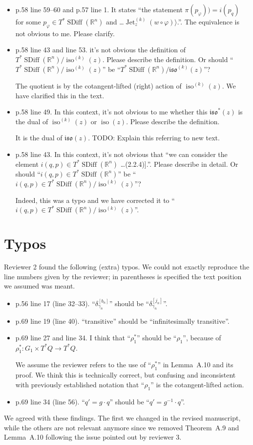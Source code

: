 \documentclass{article}
\def\R{\mathbb{R} }
\def\R{\mathbb{R} }
\DeclareMathOperator{\SDiff}{SDiff}
\DeclareMathOperator{\Jet}{Jet}
\DeclareMathOperator{\iso}{iso}
\begin{document}
\begin{itemize}
\item p.58 line 59--60 and p.57 line 1. It states ``the statement
  $\pi(p_\varphi)) = i(p_q)$ for some $p_\varphi \in T^*\SDiff(\R^n)$
  and \ldots $\Jet_z^{(k)}(w \circ \varphi)\rangle$.''.
  The equivalence is not obvious to me. Please clarify.

\item p.58 line 43 and line 53. it's not obvious the definition of
  $T^*\SDiff(\R^n)/\iso^{(k)}(z)$.
  Please describe the definition. Or should
  ``$T^*\SDiff(\R^n)/\iso^{(k)}(z)$''
  be ``$T^*\SDiff(\R^n)/\mathfrak{iso}^{(k)}(z)$''?

  The quotient is by the cotangent-lifted (right) action of
  $\iso^{(k)}(z)$. We have clarified this in the text.

\item p.58 line 49. In this context, it's not obvious to me whether
  this $\mathfrak{iso}^*(z)$ is the dual of $\iso^{(k)}(z)$ or
  $\iso(z)$. Please describe the definition.

  It is the dual of $\mathfrak{iso}(z)$.
  {\color{red} TODO: Explain this referring to new text.}

\item p.58 line 43. In this context, it's not obvious that ``we can
  consider the element $i(q, p) \in T^*\SDiff(\R^n)$ \ldots (2.2.4)].''.
  Please describe in detail. Or should ``$i(q,p) \in T^*\SDiff(\R^n)$''
  be ``$i(q,p) \in T^*\SDiff(\R^n) / \iso^{(k)}(z)$''?

  Indeed, this was a typo and we have corrected it to
  ``$i(q,p) \in T^*\SDiff(\R^n) / \iso^{(k)}(z)$''.
\end{itemize}

\section{Typos}
Reviewer 2 found the following (extra) typos. We could not exactly
reproduce the line numbers given by the reviewer; in parentheses is
specified the text position we assumed was meant.
\begin{itemize}
\item p.56 line 17 (line 32--33). ``$\delta_{\gamma_n}^{[b_n]}$'' should be ``$\delta_{\gamma_n}^{[j_n]}$''.
\item p.69 line 19 (line 40). ``transitive'' should be ``infinitesimally transitive''.
\item p.69 line 27 and line 34. I think that ``$\rho_1^*$'' should be
  ``$\rho_1$'', because of $\rho_1^*: G_1 \times T^*Q \to T^*Q$.

  We assume the reviewer refers to the use of ``$\rho_1^*$'' in
  Lemma~A.10 and its proof. We think this is technically correct, but
  confusing and inconsistent with previously established notation that
  ``$\rho_1$'' is the cotangent-lifted action.
\item p.69 line 34 (line 56). ``$q' = g \cdot q$'' should be ``$q' = g^{-1} \cdot q$''.
\end{itemize}

\noindent
We agreed with these findings. The first we changed in the revised
manuscript, while the others are not relevant anymore since we removed
Theorem~A.9 and Lemma~A.10 following the issue pointed out by reviewer 3.
\end{document}
